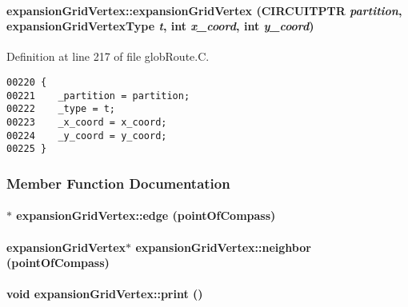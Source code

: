 \paragraph{\setlength{\rightskip}{0pt plus 5cm}expansion\-Grid\-Vertex::expansion\-Grid\-Vertex (CIRCUITPTR {\em partition}, {\bf expansion\-Grid\-Vertex\-Type} {\em t}, int {\em x\_\-coord}, int {\em y\_\-coord})}\hfill



Definition at line 217 of file glob\-Route.C.\small\begin{verbatim}00220 {
00221    _partition = partition;
00222    _type = t;
00223    _x_coord = x_coord;
00224    _y_coord = y_coord;
00225 }
\end{verbatim}\normalsize 


\subsubsection{Member Function Documentation}
\label{expansionGridVertex_a2}
\paragraph{$\ast$ expansion\-Grid\-Vertex::edge ({\bf point\-Of\-Compass})}\hfill

\label{expansionGridVertex_a1}
\paragraph{\setlength{\rightskip}{0pt plus 5cm}expansion\-Grid\-Vertex$\ast$ expansion\-Grid\-Vertex::neighbor ({\bf point\-Of\-Compass})}\hfill

\label{expansionGridVertex_a6}
\paragraph{\setlength{\rightskip}{0pt plus 5cm}void expansion\-Grid\-Vertex::print ()\hspace{0.3cm}{\tt  [inline, virtual]}}\hfill



